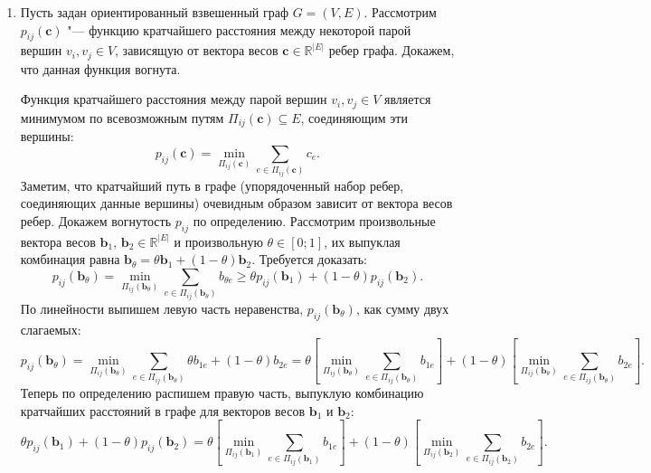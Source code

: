 \documentclass[a4paper,12pt]{article}
\begin{document}
\begin{enumerate}
\begin{enumerate}
		\end{enumerate}
		
		\item 
		Пусть задан ориентированный взвешенный граф $G=(V,E)$. Рассмотрим $p_{ij}(\mathbf{c})$ "--- функцию кратчайшего расстояния между некоторой парой вершин $v_i,v_j \in V$, зависящую от вектора весов $\mathbf{c}\in\mathbb{R}^{\vert E \vert}$ ребер графа. Докажем, что данная функция вогнута.
		
		 Функция кратчайшего расстояния между парой вершин $v_i,v_j \in V$ является минимумом по всевозможным путям $\Pi_{ij}(\mathbf{c})\subseteq E$, соединяющим эти вершины:
		 \begin{equation*}
		 	p_{ij}(\mathbf{c}) = \min_{\Pi_{ij}(\mathbf{c})}\sum_{e\in \Pi_{ij}(\mathbf{c})} c_e.
		 \end{equation*}
		 Заметим, что кратчайший путь в графе (упорядоченный набор ребер, соединяющих данные вершины) очевидным образом зависит от вектора весов ребер. Докажем вогнутость $p_{ij}$ по определению. Рассмотрим произвольные вектора весов $\mathbf{b}_1,\,\mathbf{b}_2 \in \mathbb{R}^{\vert E \vert}$ и произвольную $\theta\in[0;1]$, их выпуклая комбинация равна $\mathbf{b}_\theta = \theta \mathbf{b}_1 + (1-\theta) \mathbf{b}_2$. Требуется доказать:
		 \begin{equation*}
		 	p_{ij}(\mathbf{b}_\theta) = \min_{\Pi_{ij}(\mathbf{b}_\theta)}\sum_{e\in \Pi_{ij}(\mathbf{b}_\theta)} b_{\theta e} \geqslant \theta p_{ij}(\mathbf{b}_1) + (1-\theta) p_{ij}(\mathbf{b}_2).
		 \end{equation*}
		 По линейности выпишем левую часть неравенства, $p_{ij}(\mathbf{b}_\theta)$, как сумму двух слагаемых:
		\begin{equation*}
			p_{ij}(\mathbf{b}_\theta) = \min_{\Pi_{ij}(\mathbf{b}_{\theta})}\sum_{e\in \Pi_{ij}(\mathbf{b}_\theta)} \theta b_{1 e} + (1-\theta) b_{2e} = \theta \left[ \min_{\Pi_{ij}(\mathbf{b}_\theta)}\sum_{e\in \Pi_{ij}(\mathbf{b}_{\theta})} b_{1 e} \right] + (1-\theta) \left[ \min_{\Pi_{ij}(\mathbf{b}_\theta)}\sum_{e\in \Pi_{ij}(\mathbf{b}_{\theta})} b_{2 e} \right].
		\end{equation*}
		Теперь по определению распишем правую часть, выпуклую комбинацию кратчайших расстояний в графе для векторов весов $\mathbf{b}_1$ и $\mathbf{b}_2$:
		\begin{equation*}
			\theta p_{ij}(\mathbf{b}_1) + (1-\theta) p_{ij}(\mathbf{b}_2) = 
			\theta\left[ \min_{\Pi_{ij}(\mathbf{b}_1)}\sum_{e\in \Pi_{ij}(\mathbf{b}_1)} b_{1e}\right] + (1-\theta)\left[\min_{\Pi_{ij}(\mathbf{b}_2)}\sum_{e\in \Pi_{ij}(\mathbf{b}_2)} b_{2e}\right].

\end{equation*}
\end{enumerate}
\end{document}
